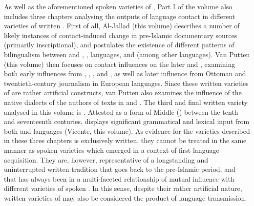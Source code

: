 \documentclass[output=paper]{langsci/langscibook}
\begin{document}
As well as the aforementioned spoken varieties of , Part I of the volume also includes three chapters analysing the outputs of language contact in different varieties of written . First of all, Al-Jallad (this volume) describes a number of likely instances of contact-induced change in pre-Islamic  documentary sources (primarily inscriptional), and postulates the existence of different patterns of {bilingualism} between  and , ,  languages, and  (among other languages). Van Putten (this volume) then focuses on contact influences on the later  and , examining both early influences from , , ,  and , as well as later influence from Ottoman  and twentieth-century journalism in European languages. Since these written varieties of  are rather artificial constructs, van Putten also examines the influence of the native  dialects of the authors of texts in   and . The third and final written  variety analysed in this volume is  . Attested as a form of Middle  (\citealt{Lentin2011Middle}) between the tenth and seventeenth centuries,   displays significant grammatical and lexical input from both  and  languages (Vicente, this volume). As evidence for the  varieties described in these three chapters is exclusively written, they cannot be treated in the same manner as spoken varieties which emerged in a context of first language acquisition. They are, however, representative of a longstanding and uninterrupted written tradition that goes back to the pre-Islamic period, and that has always been in a multi-faceted relationship of mutual influence with different varieties of spoken . In this sense, despite their rather artificial nature, written varieties of  may also be considered the product of language {transmission}.
\end{document}
